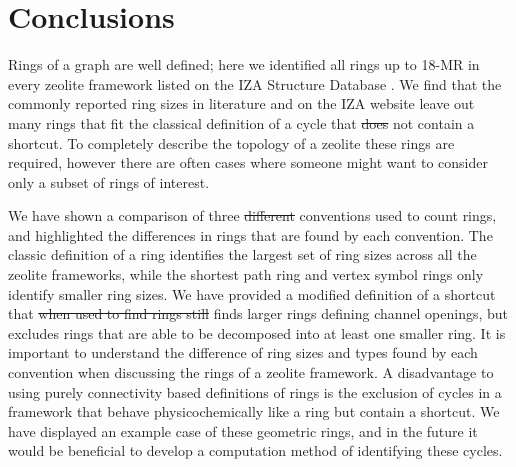 \documentclass[preprint,numrefs,noinfo,sort&compress]{elsarticle}
\providecommand{\DIFadd}[1]{{\protect\color{blue}\uwave{#1}}} %
\providecommand{\DIFdel}[1]{{\protect\color{red}\sout{#1}}}                      %
\providecommand{\DIFaddbegin}{} %
\providecommand{\DIFaddend}{} %
\providecommand{\DIFdelbegin}{} %
\providecommand{\DIFdelend}{} %
\newcommand{\DIFscaledelfig}{0.5}
\newlength{\DIFdelgraphicswidth} %
\newlength{\DIFdelgraphicsheight} %
\newcommand{\DIFaddincludegraphics}[2][]{{\color{blue}\fbox{\DIFOincludegraphics[#1]{#2}}}} %
\newcommand{\DIFdelincludegraphics}[2][]{%
\sbox{\DIFdelgraphicsbox}{\DIFOincludegraphics[#1]{#2}}%
\settoboxwidth{\DIFdelgraphicswidth}{\DIFdelgraphicsbox} %
\settoboxtotalheight{\DIFdelgraphicsheight}{\DIFdelgraphicsbox} %
\scalebox{\DIFscaledelfig}{%
\parbox[b]{\DIFdelgraphicswidth}{\usebox{\DIFdelgraphicsbox}\\[-\baselineskip] \rule{\DIFdelgraphicswidth}{0em}}\llap{\resizebox{\DIFdelgraphicswidth}{\DIFdelgraphicsheight}{%
\setlength{\unitlength}{\DIFdelgraphicswidth}%
\begin{picture}(1,1)%
\thicklines\linethickness{2pt} %
{\color[rgb]{1,0,0}\put(0,0){\framebox(1,1){}}}%
{\color[rgb]{1,0,0}\put(0,0){\line( 1,1){1}}}%
{\color[rgb]{1,0,0}\put(0,1){\line(1,-1){1}}}%
\end{picture}%
}\hspace*{3pt}}} %
} %
\DeclareRobustCommand{\DIFaddbegin}{\DIFOaddbegin \let\includegraphics\DIFaddincludegraphics} %
\DeclareRobustCommand{\DIFaddend}{\DIFOaddend \let\includegraphics\DIFOincludegraphics} %
\DeclareRobustCommand{\DIFdelbegin}{\DIFOdelbegin \let\includegraphics\DIFdelincludegraphics} %
\DeclareRobustCommand{\DIFdelend}{\DIFOaddend \let\includegraphics\DIFOincludegraphics} %
\begin{document}
\begin{table}
\end{table}
\section{Conclusions}
\DIFdelbegin %
\DIFdelend \DIFaddbegin \label{sec:org9840720}
\DIFaddend Rings of a graph are well defined; here we identified all rings up to 18-MR in every zeolite framework listed on the IZA Structure Database \cite{baerlocher-database-nodate}. We find that the commonly reported ring sizes in literature and on the IZA website leave out many rings that fit the classical definition of a cycle that \DIFdelbegin \DIFdel{does }\DIFdelend \DIFaddbegin \DIFadd{do }\DIFaddend not contain a shortcut. To completely describe the topology of a zeolite these rings are required, however there are often cases where someone might want to consider only a subset of rings of interest. 

We have shown a comparison of three \DIFdelbegin \DIFdel{different }\DIFdelend \DIFaddbegin \DIFadd{existing }\DIFaddend conventions used to count rings, and highlighted the differences in rings that are found by each convention. The classic definition of a ring identifies the largest set of ring sizes across all the zeolite frameworks, while the shortest path ring and vertex symbol rings only identify smaller ring sizes. We have provided a modified definition of a shortcut that \DIFdelbegin \DIFdel{when used to find rings still }\DIFdelend finds larger rings defining channel openings, but excludes rings that are able to be decomposed into at least one smaller ring. It is important to understand the difference of ring sizes and types found by each convention when discussing the rings of a zeolite framework. A disadvantage to using purely connectivity based definitions of rings is the exclusion of cycles in a framework that behave physicochemically like a ring but contain a shortcut. We have displayed an example case of these geometric rings, and in the future it would be beneficial to develop a computation method of identifying these cycles. 
\end{document}
